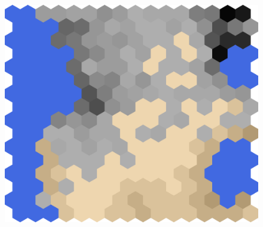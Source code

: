 \documentclass[conference]{IEEEtran}
\theoremstyle{definition}
\begin{document}
\begin{figure}
\begin{minipage}{.19\textwidth}
		\includegraphics[width=\textwidth]{tf-e}
	\end{minipage}
	

\end{figure}
\end{document}
